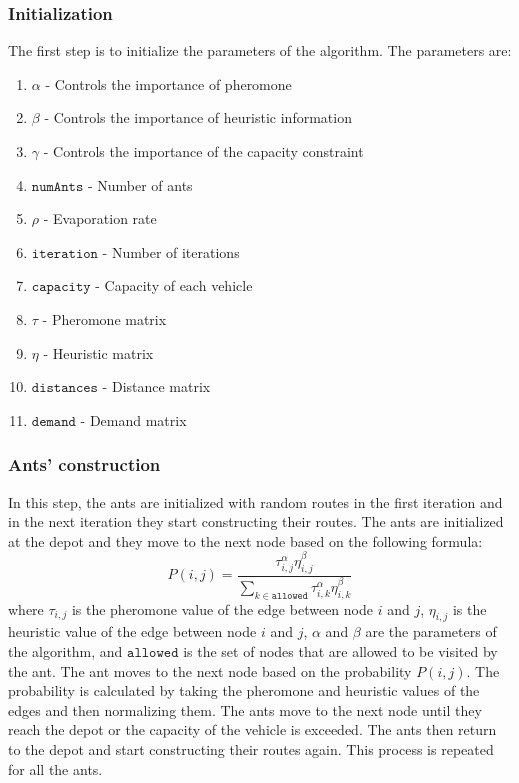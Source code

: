 \documentclass{article}
\begin{document}
\subsubsection{Initialization}
The first step is to initialize the parameters of the algorithm. The parameters are:
\begin{enumerate}
  \item $\alpha$ - Controls the importance of pheromone
  \item $\beta$ - Controls the importance of heuristic information
  \item $\gamma$ - Controls the importance of the capacity constraint
  \item $\texttt{numAnts}$ - Number of ants
  \item $\rho$ - Evaporation rate
  \item $\texttt{iteration}$ - Number of iterations
  \item $\texttt{capacity}$ - Capacity of each vehicle
  \item $\tau$ - Pheromone matrix
  \item $\eta$ - Heuristic matrix
  \item $\texttt{distances}$ - Distance matrix
  \item $\texttt{demand}$ - Demand matrix
\end{enumerate}

\subsubsection{Ants' construction}
In this step, the ants are initialized with random routes in the first iteration and in the next iteration they start constructing their routes. The ants are initialized at the depot and they move to the next node based on the following formula:
\begin{equation}
  P(i,j) = \frac{\tau_{i,j}^\alpha \eta_{i,j}^\beta}{\sum_{k \in \texttt{allowed}} \tau_{i,k}^\alpha \eta_{i,k}^\beta}
\end{equation}
where $\tau_{i,j}$ is the pheromone value of the edge between node $i$ and $j$, $\eta_{i,j}$ is the heuristic value of the edge between node $i$ and $j$, $\alpha$ and $\beta$ are the parameters of the algorithm, and $\texttt{allowed}$ is the set of nodes that are allowed to be visited by the ant. The ant moves to the next node based on the probability $P(i,j)$. The probability is calculated by taking the pheromone and heuristic values of the edges and then normalizing them. The ants move to the next node until they reach the depot or the capacity of the vehicle is exceeded. The ants then return to the depot and start constructing their routes again. This process is repeated for all the ants.
\end{document}
